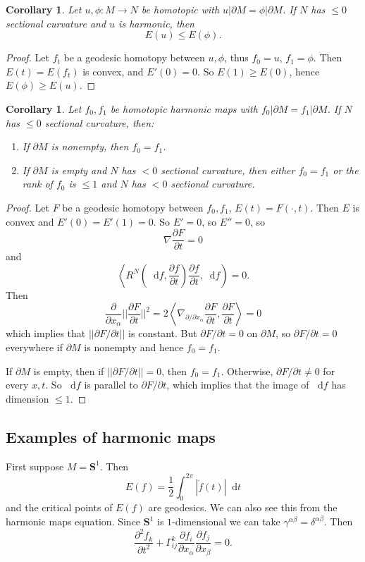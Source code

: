 \documentclass[reqno,12pt,letterpaper]{amsart}
\newcommand{\Sph}{\mathbf S}
\newcommand*\dif{\mathop{}\!\mathrm{d}}
\newcommand{\parl}{\left(}
\newcommand{\parr}{\right)}
\newcommand{\bral}{\left\langle}
\newcommand{\brar}{\right\rangle}
\newtheorem{corollary}[theorem]{Corollary}
\theoremstyle{definition}
\numberwithin{equation}{section}
\begin{document}
\begin{corollary}
Let $u, \phi: M \to N$ be homotopic with $u|\partial M = \phi|\partial M$.
If $N$ has $\leq 0$ sectional curvature and $u$ is harmonic, then
$$E(u) \leq E(\phi).$$
\end{corollary}
\begin{proof}
Let $f_t$ be a geodesic homotopy between $u, \phi$, thus $f_0 = u$, $f_1 = \phi$. Then $E(t) = E(f_t)$ is convex, and $E'(0) = 0$. So $E(1) \geq E(0)$, hence $E(\phi) \geq E(u)$.
\end{proof}

\begin{corollary}
Let $f_0, f_1$ be homotopic harmonic maps with $f_0|\partial M = f_1|\partial M$.
If $N$ has $\leq 0$ sectional curvature, then:
\begin{enumerate}
\item If $\partial M$ is nonempty, then $f_0 = f_1$.
\item If $\partial M$ is empty and $N$ has $< 0$ sectional curvature, then either $f_0 = f_1$ or the rank of $f_0$ is $\leq 1$ and $N$ has $< 0$ sectional curvature.
\end{enumerate}
\end{corollary}
\begin{proof}
Let $F$ be a geodesic homotopy between $f_0, f_1$, $E(t) = F(\cdot, t)$. Then $E$ is convex and $E'(0) = E'(1) = 0$. So $E' = 0$, so $E'' = 0$, so 
$$\nabla \frac{\partial F}{\partial t} = 0$$
and 
$$\bral R^N \parl \dif f, \frac{\partial f}{\partial t} \parr \frac{\partial f}{\partial t}, \dif f \parr = 0.$$
Then 
$$\frac{\partial}{\partial x_\alpha} ||\frac{\partial F}{\partial t}||^2 = 2 \bral \nabla_{\partial/\partial x_\alpha} \frac{\partial F}{\partial t}, \frac{\partial F}{\partial t} \brar = 0$$
which implies that $||\partial F/\partial t||$ is constant.
But $\partial F/\partial t = 0$ on $\partial M$, so $\partial F/\partial t = 0$ everywhere if $\partial M$ is nonempty and hence $f_0 = f_1$.

If $\partial M$ is empty, then if $||\partial F/\partial t|| = 0$, then $f_0 = f_1$.
Otherwise, $\partial F/\partial t \neq 0$ for every $x, t$. So $\dif f$ is parallel to $\partial F/\partial t$, which implies that the image of $\dif f$ has dimension $\leq 1$.
\end{proof}

\subsection{Examples of harmonic maps}
First suppose $M = \Sph^1$.
Then 
$$E(f) = \frac{1}{2} \int_0^{2\pi} |\dot f(t)| \dif t$$
and the critical points of $E(f)$ are geodesics.
We can also see this from the harmonic maps equation.
Since $\Sph^1$ is $1$-dimensional we can take $\gamma^{\alpha \beta} = \delta^{\alpha \beta}$.
Then 
$$\frac{\partial^2 f_k}{\partial t^2} + \Gamma_{ij}^k \frac{\partial f_i}{\partial x_\alpha} \frac{\partial f_j}{\partial x_\beta} = 0.$$
\end{document}
